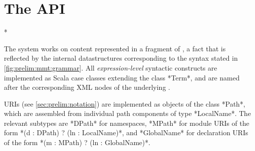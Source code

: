 
\section{The \mmt API}

\lstMakeShortInline[language=scala]*

The \mmt system works on content represented in a fragment of \omdoc, a fact that is reflected by the internal datastructures corresponding to the syntax stated in \autoref{fig:prelim:mmt:grammar}. All \emph{expression-level} syntactic constructs are implemented as Scala case classes extending the class *Term*, and are named after the corresponding XML nodes of the underlying \omdoc. 

\mmt URIs (see \autoref{sec:prelim:notation}) are implemented as objects of the class *Path*, which are assembled from individual path components of type *LocalName*. The relevant subtypes are *DPath* for namespaces, *MPath* for module URIs of the form *(d : DPath) ? (ln : LocalName)*, and *GlobalName* for declaration URIs of the form *(m : MPath) ? (ln : GlobalName)*.

